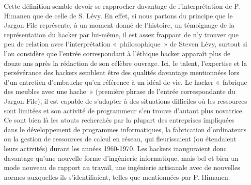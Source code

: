 \documentclass{FramateX}
\begin{document}
\begin{refsection}
Cette définition semble devoir se rapprocher davantage de
l'interprétation de P. Himanen que de celle de S.
Lévy. En effet, si nous partons du principe que le Jargon File
représente, à un moment donné de l'histoire, un
témoignage de la représentation du hacker par lui-même, il est assez
frappant de n'y trouver que peu de relation avec
l'interprétation «~philosophique~» de Steven Lévy,
surtout si l'on considère que
l'entrée correspondant à l'éthique
hacker apparaît plus de douze ans après la rédaction de son célèbre
ouvrage. Ici, le talent, l'expertise et la
persévérance des hackers semblent être des qualités davantage
mentionnées lors d'un entretien
d'embauche qu'en référence à un idéal
de vie. Le hacker «~fabrique des meubles avec une hache~» (première
phrase de l'entrée correspondante du Jargon File), il est capable de
s'adapter à des situations difficiles où les
ressources sont limitées et son activité de programmeur
s'en trouve d'autant plus novatrice.
Ce sont bien là les atouts recherchés par la plupart des entreprises
impliquées dans le développement de programmes informatiques, la
fabrication d'ordinateurs ou la gestion de ressources
de calcul en réseau, qui fleurissaient (ou étendaient leurs activités)
durant les années 1960-1970. Les hackers inauguraient donc davantage
qu'une nouvelle forme d'ingénierie
informatique, mais bel et bien un mode nouveau de rapport au travail,
une ingénierie artisanale avec de nouvelles normes auxquelles ils
s'identifiaient, telles que mentionnées par P.
Himanen.


\end{refsection}
\end{document}
